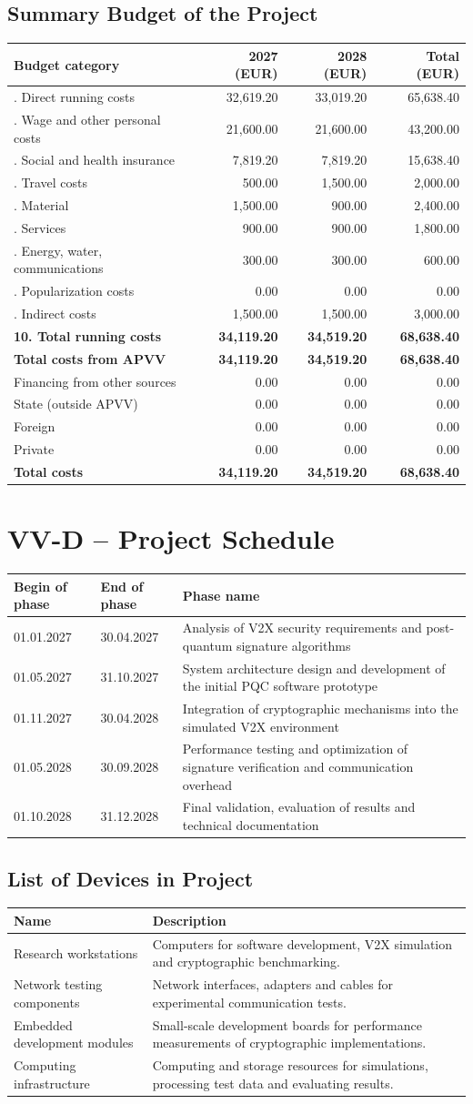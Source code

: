 \documentclass[11pt, a4paper]{article}
\makeatletter
\renewcommand{\arraystretch}{1.15}
\newcommand{\budgettable}{%
\small
\begin{tabularx}{\linewidth}{@{}>{\raggedright\arraybackslash}Xrrr@{}}
\toprule
\textbf{Budget category} & \textbf{2027 (EUR)} & \textbf{2028 (EUR)} & \textbf{Total (EUR)}\\
\midrule
01. Direct running costs & 32,619.20 & 33,019.20 & 65,638.40\\
\quad 02. Wage and other personal costs & 21,600.00 & 21,600.00 & 43,200.00\\
\quad 03. Social and health insurance & 7,819.20 & 7,819.20 & 15,638.40\\
\quad 04. Travel costs & 500.00 & 1,500.00 & 2,000.00\\
\quad 05. Material & 1,500.00 & 900.00 & 2,400.00\\
\quad 06. Services & 900.00 & 900.00 & 1,800.00\\
\quad 07. Energy, water, communications & 300.00 & 300.00 & 600.00\\
\quad 08. Popularization costs & 0.00 & 0.00 & 0.00\\
09. Indirect costs & 1,500.00 & 1,500.00 & 3,000.00\\
\midrule
\textbf{10. Total running costs} & \textbf{34,119.20} & \textbf{34,519.20} & \textbf{68,638.40}\\
\textbf{Total costs from APVV} & \textbf{34,119.20} & \textbf{34,519.20} & \textbf{68,638.40}\\
Financing from other sources & 0.00 & 0.00 & 0.00\\
\quad State (outside APVV) & 0.00 & 0.00 & 0.00\\
\quad Foreign & 0.00 & 0.00 & 0.00\\
\quad Private & 0.00 & 0.00 & 0.00\\
\textbf{Total costs} & \textbf{34,119.20} & \textbf{34,519.20} & \textbf{68,638.40}\\
\bottomrule
\end{tabularx}
\normalsize}
\makeatother
\begin{document}
\subsection*{Summary Budget of the Project}
\budgettable

\section*{VV-D -- Project Schedule}

\begin{table}[htbp]
\centering
\renewcommand{\arraystretch}{1.25}
\begin{tabularx}{\textwidth}{@{}p{2.6cm}p{2.6cm}>{\raggedright\arraybackslash}X@{}}
\toprule
\textbf{Begin of phase} & \textbf{End of phase} & \textbf{Phase name} \\
\midrule
01.01.2027 & 30.04.2027 & Analysis of V2X security requirements and post-quantum signature algorithms \\
01.05.2027 & 31.10.2027 & System architecture design and development of the initial PQC software prototype \\
01.11.2027 & 30.04.2028 & Integration of cryptographic mechanisms into the simulated V2X environment \\
01.05.2028 & 30.09.2028 & Performance testing and optimization of signature verification and communication overhead \\
01.10.2028 & 31.12.2028 & Final validation, evaluation of results and technical documentation \\
\bottomrule
\end{tabularx}
\end{table}

\subsection*{List of Devices in Project}

\begin{table}[htbp]
\centering
\renewcommand{\arraystretch}{1.25}
\begin{tabularx}{\textwidth}{@{}p{4.1cm}>{\raggedright\arraybackslash}X@{}}
\toprule
\textbf{Name} & \textbf{Description} \\
\midrule
Research workstations & Computers for software development, V2X simulation and cryptographic benchmarking. \\
Network testing components & Network interfaces, adapters and cables for experimental communication tests. \\
Embedded development modules & Small-scale development boards for performance measurements of cryptographic implementations. \\
Computing infrastructure & Computing and storage resources for simulations, processing test data and evaluating results. \\
\bottomrule
\end{tabularx}
\end{table}
\end{document}
